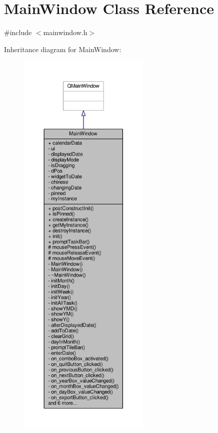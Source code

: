 \hypertarget{classMainWindow}{}\section{Main\+Window Class Reference}
\label{classMainWindow}


{\ttfamily \#include $<$mainwindow.\+h$>$}



Inheritance diagram for Main\+Window\+:
\nopagebreak
\begin{figure}[H]
\begin{center}
\leavevmode
\includegraphics[height=550pt]{classMainWindow__inherit__graph}
\end{center}
\end{figure}


